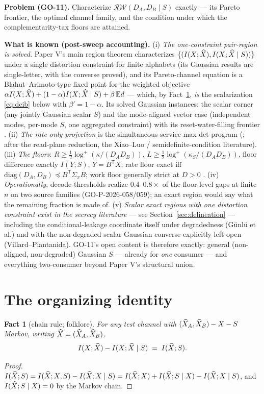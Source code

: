 \documentclass[11pt]{article}
\newtheorem{fact}{Fact}\newtheorem{conjecture}{Conjecture}
\newcommand{\E}{\mathbb{E}}\newcommand{\tr}{\operatorname{tr}}
\begin{document}
\textbf{Problem (GO-11).} Characterize $\mathcal{RW}(D_A,D_B\mid S)$
exactly --- its Pareto frontier, the optimal channel family, and the
condition under which the complementarity-tax floors \cite{bondtaxnote} are
attained.

\textbf{What is known (post-sweep accounting).}
(i) \emph{The one-constraint pair-region is solved.} Paper V's
main region theorem characterizes
$\{(I(X;\widehat X),I(X;\widehat X\mid S))\}$ under a single distortion constraint for
finite alphabets (its Gaussian results are single-letter, with the converse proved), and its Pareto-channel equation is a Blahut--Arimoto-type
fixed point for the weighted objective
$\alpha I(X;\hX)+(1-\alpha)I(X;\hX\mid S)+\beta\,\E d$ --- which, by
Fact~\ref{fact:gap}, \emph{is} the scalarization \eqref{eq:dcib} below with
$\beta'=1-\alpha$. Its solved Gaussian instances: the scalar corner (any
jointly Gaussian scalar $S$) and the mode-aligned vector case (independent
modes, per-mode $S$, one aggregated constraint) with its reset-water-filling
frontier \cite{bondlandauerV}. (ii) \emph{The rate-only projection} is the
simultaneous-service max-det program (\cite{bondtwoobserver}; after the
read-plane reduction, the Xiao--Luo / semidefinite-condition literature).
(iii) \emph{The floors}: $R\ge\tfrac12\log^+(\kappa/(D_AD_B))$,
$L\ge\tfrac12\log^+(\kappa_S/(D_AD_B))$, floor difference exactly $I(Y;S)$,
$Y=B^{\mathsf T}X$; rate floor exact iff
$\mathrm{diag}(D_A,D_B)\preceq B^{\mathsf T}\Sigma_xB$; work floor generally
strict at $D>0$ \cite{bondtaxnote}. (iv) \emph{Operationally}, decode
thresholds realize $0.4$--$0.8\times$ of the floor-level gaps at finite $n$
on two source families (GO-P-2026-058/059); an exact region would say what
the remaining fraction is made of. (v) \emph{Scalar exact regions with one
distortion constraint exist in the secrecy literature} --- see
Section~\ref{sec:delineation} --- including the conditional-leakage
coordinate itself under degradedness (G\"unl\"u et al.) and with the
non-degraded scalar Gaussian converse explicitly left open
(Villard--Piantanida). GO-11's open content is therefore exactly: general
(non-aligned, non-degraded) Gaussian $S$ --- already for \emph{one}
consumer --- and everything two-consumer beyond Paper V's structural union.

\section{The organizing identity}
\begin{fact}[chain rule; folklore]\label{fact:gap}
For any test channel with $(\widehat X_A,\widehat X_B)-X-S$ Markov, writing
$\widehat X=(\widehat X_A,\widehat X_B)$,
\[
I(X;\widehat X)-I(X;\widehat X\mid S)\;=\;I(\widehat X;S).
\]
\end{fact}
\begin{proof}
$I(\widehat X;S)=I(\widehat X;X,S)-I(\widehat X;X\mid S)=I(\widehat X;X)+I(\widehat X;S\mid X)-I(\widehat X;X\mid S)$,
and $I(\widehat X;S\mid X)=0$ by the Markov chain.
\end{proof}
\end{document}
